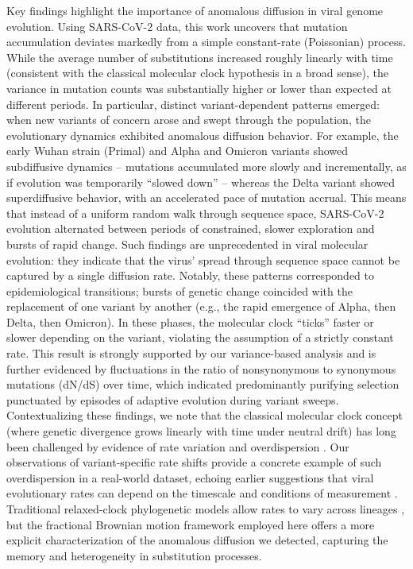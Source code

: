 Key findings highlight the importance of anomalous diffusion in viral genome evolution. Using SARS-CoV-2 data, this work uncovers that mutation accumulation deviates markedly from a simple constant-rate (Poissonian) process. While the average number of substitutions increased roughly linearly with time (consistent with the classical molecular clock hypothesis in a broad sense), the variance in mutation counts was substantially higher or lower than expected at different periods. In particular, distinct variant-dependent patterns emerged: when new variants of concern arose and swept through the population, the evolutionary dynamics exhibited anomalous diffusion behavior. For example, the early Wuhan strain (Primal) and Alpha and Omicron variants showed subdiffusive dynamics -- mutations accumulated more slowly and incrementally, as if evolution was temporarily ``slowed down'' -- whereas the Delta variant showed superdiffusive behavior, with an accelerated pace of mutation accrual. This means that instead of a uniform random walk through sequence space, SARS-CoV-2 evolution alternated between periods of constrained, slower exploration and bursts of rapid change. Such findings are unprecedented in viral molecular evolution: they indicate that the virus' spread through sequence space cannot be captured by a single diffusion rate. Notably, these patterns corresponded to epidemiological transitions; bursts of genetic change coincided with the replacement of one variant by another (e.g., the rapid emergence of Alpha, then Delta, then Omicron). In these phases, the molecular clock ``ticks'' faster or slower depending on the variant, violating the assumption of a strictly constant rate. This result is strongly supported by our variance-based analysis and is further evidenced by fluctuations in the ratio of nonsynonymous to synonymous mutations (dN/dS) over time, which indicated predominantly purifying selection punctuated by episodes of adaptive evolution during variant sweeps. Contextualizing these findings, we note that the classical molecular clock concept (where genetic divergence grows linearly with time under neutral drift) has long been challenged by evidence of rate variation and overdispersion \cite{Ho2011}. Our observations of variant-specific rate shifts provide a concrete example of such overdispersion in a real-world dataset, echoing earlier suggestions that viral evolutionary rates can depend on the timescale and conditions of measurement \cite{Ho2011}. Traditional relaxed-clock phylogenetic models allow rates to vary across lineages \cite{Drummond2006}, but the fractional Brownian motion framework employed here offers a more explicit characterization of the anomalous diffusion we detected, capturing the memory and heterogeneity in substitution processes.

